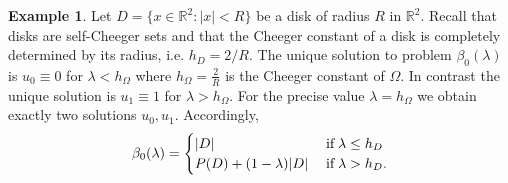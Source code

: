 \documentclass[reqno,11pt]{amsart}
\theoremstyle{definition}
\newtheorem{example}[theorem]{Example}
\numberwithin{equation}{section}
\newcommand{\RR}{\mathbb{R}}
\newcommand{\tinm}[1]{\text{\;#1\;}}
\newcommand{\1}{{{\bf 1}\kern-0,28em\rm l}}
\begin{document}
\begin{example}
Let $D=\{x\in\RR^2 :  |x| < R \}$ be a disk of radius $R$ in $\RR^2$. Recall that disks are self-Cheeger sets and that the Cheeger constant of a disk is completely determined by its radius, i.e. $h_D=2/R$. The unique solution to problem $\beta_0(\lambda)$ is $u_0\equiv 0$ for $\lambda < h_\Omega$ where $h_\Omega= \frac2{R}$ is the Cheeger constant of $\Omega$.
In contrast the unique solution is  $u_1\equiv 1$ for $\lambda>h_\Omega$. For the precise value $\lambda= h_\Omega$ we obtain exactly two solutions $u_0, u_1$. 
Accordingly,
\begin{align*}
\beta_0(\lambda) =
\begin{cases}
|D| &\tinm{if} \lambda \le h_D \\
P(D) + (1-\lambda)|D| &\tinm{if} \lambda >h_D.
\end{cases}
\end{align*}


\end{example}
\end{document}
